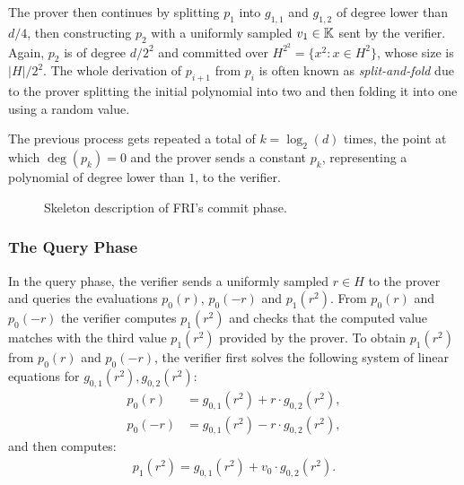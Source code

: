 The prover then continues by splitting $p_1$ into $g_{1, 1}$ and $g_{1, 2}$ of degree lower than $d/4$, then constructing $p_2$ with a uniformly sampled $v_1 \in \mathbb{K}$ sent by the verifier. Again, $p_2$ is of degree $d/2^2$ and committed over $H^{2^2} = \{x^{2} \colon x \in H^2\}$, whose size is $|H|/2^2$. The whole derivation of $p_{i+1}$ from $p_i$ is often known as \textit{split-and-fold} due to the prover splitting the initial polynomial into two and then folding it into one using a random value. 

The previous process gets repeated a total of $k = \log_2(d)$ times, the point at which $\deg(p_k) = 0$ and the prover sends a constant $p_k$, representing a polynomial of degree lower than $1$, to the verifier.

\begin{figure}[H]
\caption{Skeleton description of FRI's commit phase.}
\end{figure}

\subsubsection*{The Query Phase}

In the query phase, the verifier sends a uniformly sampled $r \in H$ to the prover and queries the evaluations $p_0(r)$, $p_0(-r)$ and $p_1(r^2)$. From $p_0(r)$ and $p_0(-r)$ the verifier computes $p_1(r^2)$ and checks that the computed value matches with the third value $p_1(r^2)$ provided
by the prover.
To obtain $p_1(r^2)$ from $p_0(r)$ and $p_0(-r)$, the verifier first solves the following system of linear equations for $g_{0,1}(r^2),g_{0,2}(r^2)$:
\begin{align*}
  p_0(r) &= g_{0,1}(r^2) + r \cdot g_{0,2}(r^2), \\
  p_0(-r) &= g_{0,1}(r^2) - r \cdot g_{0,2}(r^2),
\end{align*}
and then computes: 
\begin{align*}
  p_1(r^2) = g_{0,1}(r^2) + v_0 \cdot g_{0,2}(r^2).
\end{align*}

